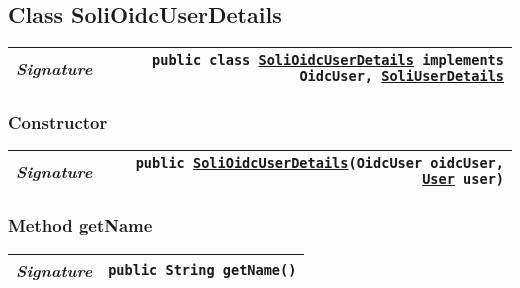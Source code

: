 \begin{adjustwidth}{1.5em}{0pt}
\begin{adjustwidth}{1.5em}{0pt}
\begin{adjustwidth}{1.5em}{0pt}
{\begin{tabularx}{1.0\linewidth}{@{}l R@{}}
      \end{tabularx}}
    \end{adjustwidth}
  \end{adjustwidth}\subsection{Class SoliOidcUserDetails\label{edu.kit.hci.soli.config.security.SoliOidcUserDetails} }
  \begin{adjustwidth}{1.5em}{0pt}
    {\begin{tabularx}{1.0\linewidth}{@{}l R@{}}
      \emph{Signature} & \texttt{public  class \texttt{\hyperref[edu.kit.hci.soli.config.security.SoliOidcUserDetails]{\texttt{SoliOidcUserDetails}} implements \texttt{OidcUser}, \texttt{\hyperref[edu.kit.hci.soli.config.security.SoliUserDetails]{\texttt{SoliUserDetails}}}}} \\
      \hline
  
    \end{tabularx}}\subsubsection{Constructor\label{edu.kit.hci.soli.config.security.SoliOidcUserDetails@edu.kit.hci.soli.config.security.SoliOidcUserDetails(org.springframework.security.oauth2.core.oidc.user.OidcUser,edu.kit.hci.soli.domain.User)}}
    \begin{adjustwidth}{1.5em}{0pt}
      {\begin{tabularx}{1.0\linewidth}{@{}l R@{}}
        \emph{Signature} & \texttt{public \texttt{\hyperref[edu.kit.hci.soli.config.security.SoliOidcUserDetails]{\texttt{SoliOidcUserDetails}}}(\texttt{OidcUser} oidcUser, \texttt{\hyperref[edu.kit.hci.soli.domain.User]{\texttt{User}}} user)} \\
        \hline
  
      \end{tabularx}}
    \end{adjustwidth}\subsubsection{Method getName\label{edu.kit.hci.soli.config.security.SoliOidcUserDetails@getName()}}
    \begin{adjustwidth}{1.5em}{0pt}
      {\begin{tabularx}{1.0\linewidth}{@{}l R@{}}
        \emph{Signature} & \texttt{public \texttt{String} getName()} \\
        \hline
  

\end{tabularx}}
\end{adjustwidth}
\end{adjustwidth}
\end{adjustwidth}
